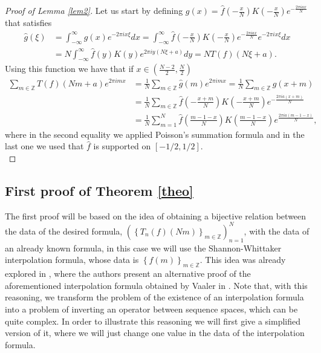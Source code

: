 \documentclass[reqno]{amsart}
\theoremstyle{plain}
\theoremstyle{definition}
\numberwithin{equation}{section}
\newcommand{\Z}{{\mathbb Z}}
\newcommand{\pa}[1]{\left(#1\right)}
\newcommand{\suc}[1]{\left\{#1\right\}}
\begin{document}
\begin{proof}[Proof of Lemma \ref{lem2}]
    Let us start by defining $g(x)=\widehat{f}\pa{-\frac{x}{N}} K\pa{-\frac{x}{N}} e^{-\frac{2\pi i a x}{N}}$ 
    that satisfies
    \begin{align*}
		\widehat{g}(\xi) &=\int_{-\infty}^\infty g(x) e^{-2\pi i x \xi} dx
        =\int_{-\infty}^\infty \widehat{f}\pa{-\frac{x}{N}} 
        K\pa{-\frac{x}{N}} e^{-\frac{2\pi i a x}{N}} e^{-2\pi i x \xi} dx \\
        &=N \int_{-\infty}^\infty \widehat{f}(y) K(y) e^{2\pi i y (N\xi+a)} dy
        =N T(f)(N\xi+a).
	\end{align*}
    Using this function we have that if $x\in \pa{\frac{N-2}{2},\frac{N}{2}}$
	\begin{align*}
		\sum_{m\in\Z} T(f)(Nm+a) e^{2\pi i m x} &=\frac{1}{N} \sum_{m\in\Z} \widehat{g}(m) e^{2\pi i m x}
        =\frac{1}{N} \sum_{m\in\Z} g(x+m) \\
        &=\frac{1}{N} \sum_{m\in\Z} \widehat{f}\pa{-\frac{x+m}{N}} K\pa{-\frac{x+m}{N}} e^{-\frac{2\pi i a (x+m)}{N}} \\
        &=\frac{1}{N} \sum_{m=1}^N \widehat{f}\pa{\frac{m-1-x}{N}} K\pa{\frac{m-1-x}{N}}e^\frac{2\pi i a (m-1-x)}{N},
	\end{align*}
    where in the second equality we applied Poisson's summation formula and in the last one we used that 
    $\widehat{f}$ is supported on $[-1/2,1/2]$. \\
\end{proof}

\subsection{First proof of Theorem \ref{theo}}

The first proof will be based on the idea of obtaining a bijective relation between the data of the desired formula, $\pa{\suc{T_n(f)(Nm)}_{m\in\Z}}_{n=1}^N$, with the data of an already known formula, in this case we will use the Shannon-Whittaker interpolation formula, whose data is $\suc{f(m)}_{m\in\Z}$. {This idea was already explored in \cite[Theorem 1.2]{RS2020}, where the authors present an alternative proof of the aforementioned interpolation formula obtained by Vaaler in \cite{Va1985}. Note that, with this reasoning, we transform the problem of the existence of an interpolation formula into a problem of inverting an operator between sequence spaces, which can be quite complex.} In order to illustrate this reasoning we will first give a simplified version of it, where we will just change one value in the data of the interpolation formula. \\
\end{document}
